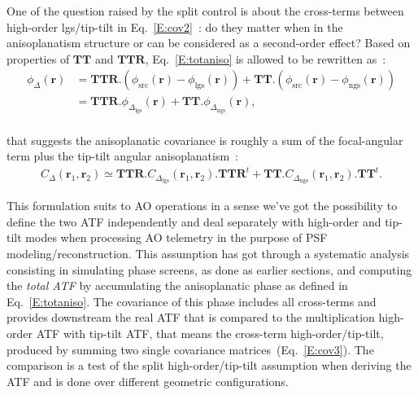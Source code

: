 \documentclass[12pt]{article}
\newcommand{\para}[1]{\left(#1\right)}
\newcommand{\rbb}{\boldsymbol{r}}
\newcommand{\rbun}{\boldsymbol{r}_1}
\newcommand{\rbdeux}{\boldsymbol{r}_2}
\newcommand{\TTout}{\boldsymbol{\text{TTR}}}
\newcommand{\TTonly}{\boldsymbol{\text{TT}}}
\begin{document}
One of the question raised by the split control is about the cross-terms between high-order lgs/tip-tilt in Eq.~\ref{E:cov2}~: do they matter when in the anisoplanatism structure or can be considered as a second-order effect? Based on properties of $\TTonly$ and $\TTout$, Eq.~\ref{E:totaniso} is allowed to be rewritten as~:
\begin{equation}
\begin{aligned}
\phi_\Delta(\rbb) &= \TTout.\para{\phi_\text{src}(\rbb) - \phi_\text{lgs}(\rbb)} + \TTonly.\para{\phi_\text{src}(\rbb)-\phi_\text{ngs}(\rbb)}\\
&= \TTout.\phi_{\Delta_\text{lgs}}(\rbb) + \TTonly.\phi_{\Delta_\text{ngs}}(\rbb),\\
\end{aligned}
\end{equation}

that suggests the anisoplanatic covariance is roughly a sum of the focal-angular term plus the tip-tilt angular anisoplanatism~:
\begin{equation} \label{E:cov3}
\begin{aligned}
C_\Delta(\rbun,\rbdeux) \simeq \TTout.C_{\Delta_\text{lgs}}(\rbun,\rbdeux).\TTout^t + \TTonly.C_{\Delta_\text{ngs}}(\rbun,\rbdeux).\TTonly^t.
\end{aligned}
\end{equation}

This formulation suits to AO operations in a sense we've got the possibility to define the two ATF independently and deal separately with high-order and tip-tilt modes when processing AO telemetry in the purpose of PSF modeling/reconstruction. This assumption has got through a systematic analysis consisting in simulating phase screens, as done as earlier sections, and computing the \emph{total ATF} by accumulating the anisoplanatic phase as defined in Eq.~\ref{E:totaniso}. The covariance of this phase includes all cross-terms and provides downstream the real ATF that is compared to the multiplication high-order ATF with tip-tilt ATF, that means the cross-term high-order/tip-tilt, produced by summing two single covariance matrices~(Eq.~\ref{E:cov3}). The comparison is a test of the split high-order/tip-tilt assumption when deriving the ATF and is done over different geometric configurations.\\
\end{document}
